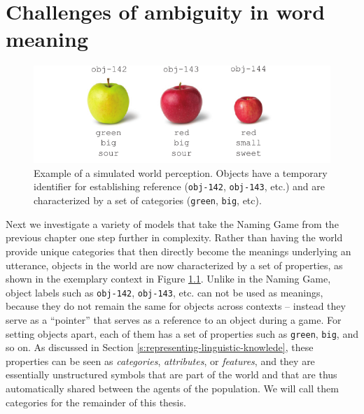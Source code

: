 
\setcounter{chapter}{4}

\chapter{Challenges of ambiguity in word meaning}
\label{c:gg}

\begin{figure}[t]
  \includegraphics{figures/sgg-example-perception-apples}
  \caption{Example of a simulated world perception. Objects have a
    temporary identifier for establishing reference (\texttt{obj-142},
    \texttt{obj-143}, etc.) and are characterized by a set of
    categories (\texttt{green}, \texttt{big}, etc).}
  \label{f:sgg-example-perception-apples}
\end{figure}

Next we investigate a variety of models that take the Naming Game from
the previous chapter one step further in complexity. Rather than
having the world provide unique categories that then directly become
the meanings underlying an utterance, objects in the world are now
characterized by a set of properties, as shown in the exemplary
context in Figure \ref{f:sgg-example-perception-apples}. Unlike in the
Naming Game, object labels such as \texttt{obj-142}, \texttt{obj-143},
etc. can not be used as meanings, because they do not remain the same
for objects across contexts -- instead they serve as a ``pointer''
that serves as a reference to an object during a game. For setting
objects apart, each of them has a set of properties such as
\texttt{green}, \texttt{big}, and so on. As discussed in Section
\ref{s:representing-linguistic-knowlede}, these properties can be seen
as \emph{categories}, \emph{attributes}, or \emph{features}, and they
are essentially unstructured symbols that are part of the world and
that are thus automatically shared between the agents of the
population. We will call them categories for the remainder of this
thesis.

\pagebreak


